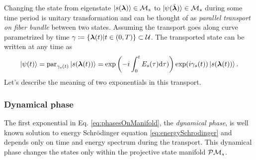 Changing the state from eigenstate $\ket{s({\bm\lambda})}\in\mathcal{M}_s$ to $\ket{\psi(\tilde{{\bm\lambda}})}\in\mathcal{M}_s$ during some time period is unitary transformation and can be thought of as \emph{parallel transport on fiber bundle} between two states. Assuming the transport goes along curve parametrized by time $\gamma\coloneqq\{{\bm\lambda}(t)|t\in(0,T)\}\subset \mathcal U$. The transported state can be written at any time as
\begin{equation}
    \ket{\psi(t)} = \textrm{par}_{\gamma_s(t)}\ket{s({\bm\lambda}(t))} = \exp\left(-i\int_0^tE_s(\tau)\mathrm{d}\tau)\right)\exp(i\gamma_s(t))\ket{s({\bm\lambda}(t))}.
    \label{eq:phasesOnManifold}
\end{equation}
Let's describe the meaning of two exponentials in this transport.
\subsubsection{Dynamical phase}
The first exponential in Eq. \ref{eq:phasesOnManifold}, the \emph{dynamical phase}, is well known solution to energy Schr\"odinger equation \ref{eq:energySchrodinger} and depends only on time and energy spectrum during the transport. This dynamical phase changes the states only within the projective state manifold $\mathcal{P}\mathcal{M}_s$. 

